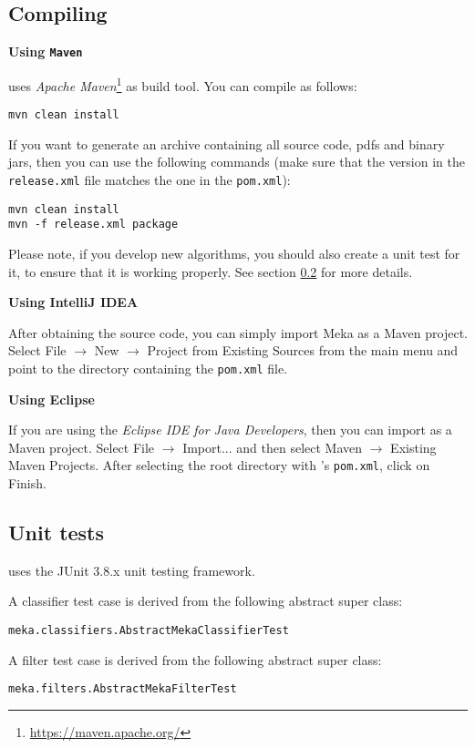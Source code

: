 \documentclass[11pt]{article}
\newcommand{\MEKA}{Meka}
\newcommand{\heading}[1]{
    \vspace{0.3cm} \noindent \textbf{#1} \newline
}
\begin{document}
\subsection{Compiling}
\label{compiling}
\heading{Using \texttt{Maven}}
\framework{\MEKA} uses \textit{Apache Maven}\footnote{\url{https://maven.apache.org/}} as build tool. You can compile \framework{\MEKA} as follows:
\begin{lstlisting}
mvn clean install
\end{lstlisting}
If you want to generate an archive containing all source code, pdfs and binary jars, then you can use the following commands
(make sure that the version in the \texttt{release.xml} file matches the one in the \texttt{pom.xml}):
\begin{lstlisting}
mvn clean install
mvn -f release.xml package
\end{lstlisting}
Please note, if you develop new algorithms, you should also create a unit test for it, to ensure that it is working properly. See section \ref{unittests} for more details.

\heading{Using IntelliJ IDEA}
After obtaining the source code, you can simply import Meka as a Maven project.
Select \textsf{File $\rightarrow$ New $\rightarrow$ Project from Existing Sources} from the main menu and point to
the directory containing the \texttt{pom.xml} file.

\heading{Using Eclipse}
If you are using the \textit{Eclipse IDE for Java Developers}, then you can import as a Maven project.
Select \textsf{File $\rightarrow$ Import...} and then select {Maven $\rightarrow$ Existing Maven Projects}.
After selecting the root directory with \framework{\MEKA}'s \texttt{pom.xml}, click on \textsf{Finish}.

\subsection{Unit tests}
\label{unittests}
\framework{\MEKA} uses the JUnit 3.8.x unit testing framework.

\noindent A classifier test case is derived from the following abstract super class:
\begin{lstlisting}
meka.classifiers.AbstractMekaClassifierTest
\end{lstlisting}

\noindent A filter test case is derived from the following abstract super class:
\begin{lstlisting}
meka.filters.AbstractMekaFilterTest
\end{lstlisting}
\end{document}
